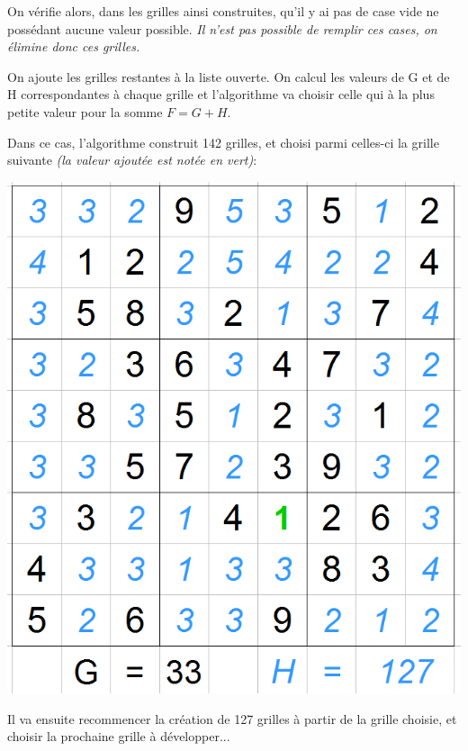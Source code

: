 On vérifie alors, dans les grilles ainsi construites, qu'il y ai pas de case vide ne possédant aucune valeur possible. \textit{Il n'est pas possible de remplir ces cases, on élimine donc ces grilles.}

On ajoute les grilles restantes à la liste ouverte. On calcul les valeurs de G et de H correspondantes à chaque grille et l'algorithme va choisir celle qui à la plus petite valeur pour la somme $F = G+H$.

Dans ce cas, l'algorithme construit 142 grilles, et choisi parmi celles-ci la grille suivante \textit{(la valeur ajoutée est notée en vert)}:

\begin{center}
\includegraphics[scale=0.3]{images/AStarExample/1.png}
\end{center}


Il va ensuite recommencer la création de 127 grilles à partir de la grille choisie, et choisir la prochaine grille à développer...


